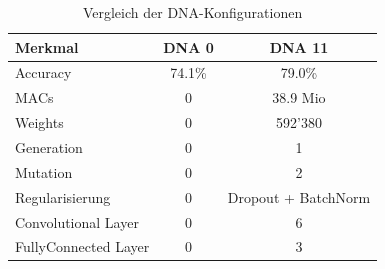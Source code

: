 \documentclass{article}
\begin{document}
\begin{table}[h]
\centering
\caption{Vergleich der DNA-Konfigurationen}
\label{tab:dna_comparison}
\begin{tabular}{lcc}
\hline
\textbf{Merkmal} & \textbf{DNA 0} & \textbf{DNA 11} \\
\hline
Accuracy & 74.1\% & 79.0\% \\
MACs & 0 & 38.9 Mio \\
Weights & 0 & 592'380 \\
Generation & 0 & 1 \\
Mutation & 0 & 2 \\
Regularisierung & 0 & Dropout + BatchNorm \\
Convolutional Layer & 0 & 6 \\
FullyConnected Layer & 0 & 3 \\
\hline
\end{tabular}
\end{table}
\end{document}

